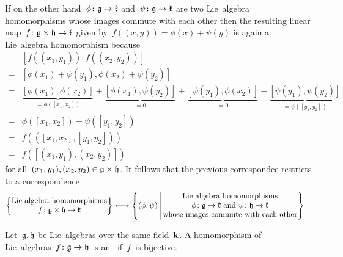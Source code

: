 \begin{example}
  If on the other hand~$\phi \colon \mathfrak{g} \to \mathfrak{k}$ and~$\psi \colon \mathfrak{g} \to \mathfrak{k}$ are two Lie~algebra homomorphisms whose images commute with each other then the resulting linear map~$f \colon \mathfrak{g} \times \mathfrak{h} \to \mathfrak{k}$ given by~$f((x,y)) = \phi(x) + \psi(y)$ is again a Lie~algebra homomorphism because
  \begin{align*}
    {}&
    [ f((x_1, y_1)), f((x_2, y_2)) ]
    \\
    ={}&
    [ \phi(x_1) + \psi(y_1), \phi(x_2) + \psi(y_2) ]
    \\
    ={}&
      \underbrace{ [ \phi(x_1), \phi(x_2) ] }_{= \phi([x_1, x_2])}
    + \underbrace{ [ \phi(x_1), \psi(y_2) ] }_{= 0}
    + \underbrace{ [ \psi(y_1), \phi(x_2) ] }_{= 0}
    + \underbrace{ [ \psi(y_1), \psi(y_2) ] }_{= \psi([y_1, y_2])}
    \\
    ={}&
    \phi( [x_1, x_2] ) + \psi( [y_1, y_2] )
    \\
    ={}&
    f( ([x_1, x_2], [y_1, y_2]) )
    \\
    ={}&
    f( [(x_1, y_1), (x_2, y_2)] )
  \end{align*}
  for all~$(x_1, y_1), (x_2, y_2) \in \mathfrak{g} \times \mathfrak{h}$.
  It follows that the previous {\onetoone} correspondce restricts to a {\onetoone} correspondence
  \begin{align*}
    \left\{
      \begin{tabular}{@{}c@{}}
        Lie~algebra homomorphisms \\
        $f \colon \glie \times \hlie \to \klie$
      \end{tabular}
    \right\}
    &\longonetoone
    \left\{
      (\phi, \psi)
    \suchthat*
      \begin{tabular}{@{}c@{}}
        Lie~algebra homomorphisms \\
        $\phi \colon \glie \to \klie$ and~$\psi \colon \hlie \to \klie$ \\
        whose images commute with each other
      \end{tabular}
    \right\}
  \end{align*}
\end{example}


\begin{definition}
 Let~$\mathfrak{g}, \mathfrak{h}$ be Lie~algebras over the same field~$\mathbf{k}$.
 A homomorphism of Lie~algebras~$f \colon \mathfrak{g} \to \mathfrak{h}$ is an~ if~$f$~is bijective.
\end{definition}


